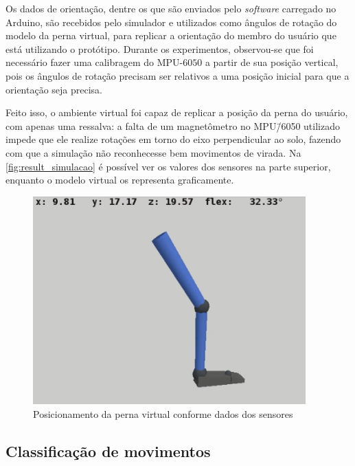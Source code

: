 Os dados de orientação, dentre os que são enviados pelo \textit{software} carregado no Arduino, são recebidos pelo simulador e utilizados como ângulos de rotação do modelo da perna virtual, para replicar a orientação do membro do usuário que está utilizando o protótipo. Durante os experimentos, observou-se que foi necessário fazer uma calibragem do MPU-\(6050\) a partir de sua posição vertical, pois os ângulos de rotação precisam ser relativos a uma posição inicial para que a orientação seja precisa.

Feito isso, o ambiente virtual foi capaz de replicar a posição da perna do usuário, com apenas uma ressalva: a falta de um magnetômetro no MPU\=/6050 utilizado impede que ele realize rotações em torno do eixo perpendicular ao solo, fazendo com que a simulação não reconhecesse bem movimentos de virada. Na \autoref{fig:result_simulacao} é possível ver os valores dos sensores na parte superior, enquanto o modelo virtual os representa graficamente.

\begin{figure}[ht]
	\caption{\label{fig:result_simulacao}Posicionamento da perna virtual conforme dados dos sensores}
	\begin{center}
	    \includegraphics[height=8cm]{resources/result_simulacao}
	\end{center}
\end{figure}

\subsection{Classificação de movimentos}\label{sec:result_classif}

